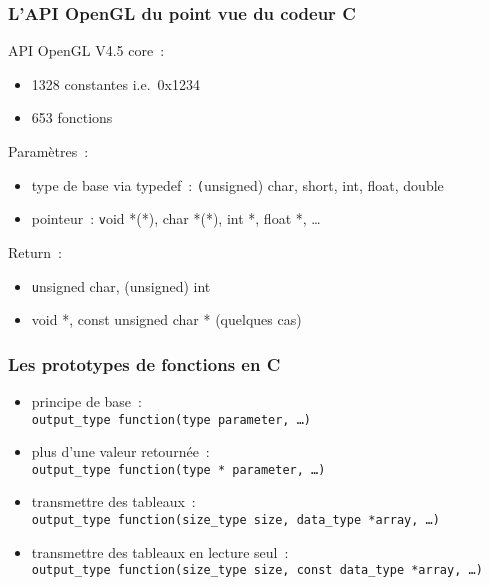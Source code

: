 
\begin{frame}
  \frametitle{L'API OpenGL du point vue du codeur C}
  API OpenGL V4.5 core~: %
  \begin{itemize}
  \item 1328 constantes \small{i.e.\ 0x1234} %
  \item 653 fonctions \\[.5em] %
  \end{itemize}
  Paramètres~:
  \begin{itemize}
  \item type de base via typedef~: {\texttt (unsigned) char, short, int, float, double}
  \item pointeur~: {\texttt void *(*), char *(*), int *, float *, \ldots} \\[.5em] %
  \end{itemize}
  Return~:
  \begin{itemize}
  \item {\texttt unsigned char, (unsigned) int}
  \item {void *, const unsigned char *} {\tiny (quelques cas)}
  \end{itemize}
\end{frame}

\begin{frame}
  \frametitle{Les prototypes de fonctions en C}
  \begin{itemize}
    \item principe de base~: \\
      \texttt{output\_type function(type parameter, \ldots)}
    \item plus d'une valeur retournée~: \\
      \texttt{output\_type function(type \alert{*} parameter, \ldots)}
    \item transmettre des tableaux~: \\
      \texttt{output\_type function(size\_type size, data\_type *array, \ldots)}
    \item transmettre des tableaux en lecture seul~: \\
      \texttt{output\_type function(size\_type size, \alert{const} data\_type *array, \ldots)}
  \end{itemize}
\end{frame}

